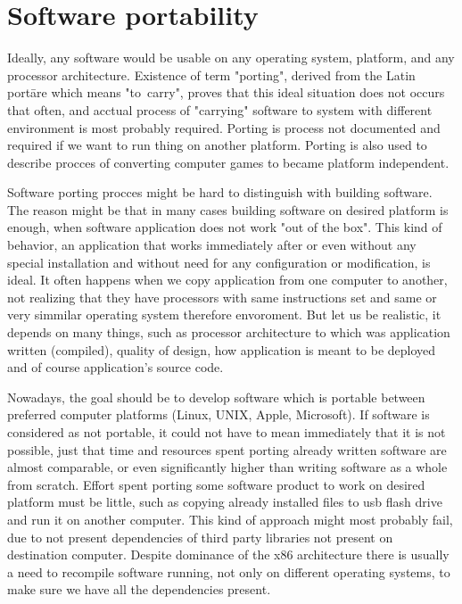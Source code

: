 \chapter{Software portability}\label{porting}

Ideally, any software would be usable on any operating system, platform, and any processor architecture.
Existence of term "porting", derived from the Latin portāre which means "to~carry", proves that this ideal situation does not occurs that often, and acctual process of "carrying" software to system with different environment is most probably required.
Porting is process not documented and required if we want to run thing on another platform.
Porting is also used to describe procces of converting computer games to became platform independent\cite{wiki_porting}.

Software porting procces might be hard to distinguish with building software.
The reason might be that in many cases building software on desired platform is enough, when software application does not work "out of the box".
This kind of behavior, an application that works immediately after or even without any special installation and without need for any configuration or modification, is ideal.
It often happens when we copy application from one computer to another, not realizing that they have processors with same instructions set and same or very simmilar operating system therefore envoroment.
But let us be realistic, it depends on many things, such as processor architecture to which was application written (compiled), quality of design, how application is meant to be deployed and of course application's source code.

Nowadays, the goal should be to develop software which is portable between preferred computer platforms (Linux, UNIX, Apple, Microsoft).
If software is considered as not portable, it could not have to mean immediately that it is not possible, just that time and resources spent porting already written software are almost comparable, or even significantly higher than writing software as a whole from scratch.
Effort spent porting some software product to work on desired platform must be little, such as copying already installed files to usb flash drive and run it on another computer.
This kind of approach might most probably fail, due to not present dependencies of third party libraries not present on destination computer.
Despite dominance of the x86 architecture there is usually a need to recompile software running, not only on different operating systems, to make sure we have all the dependencies present.


